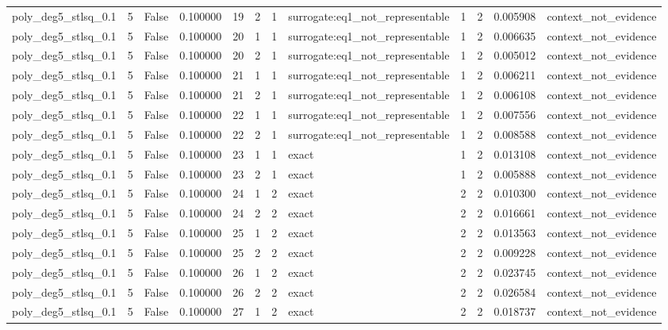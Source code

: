\begin{tabular}{lrrrrrrlrrrl}
poly\_deg5\_stlsq\_0.1 & 5 & False & 0.100000 & 19 & 2 & 1 & surrogate:eq1\_not\_representable & 1 & 2 & 0.005908 & context\_not\_evidence \\
poly\_deg5\_stlsq\_0.1 & 5 & False & 0.100000 & 20 & 1 & 1 & surrogate:eq1\_not\_representable & 1 & 2 & 0.006635 & context\_not\_evidence \\
poly\_deg5\_stlsq\_0.1 & 5 & False & 0.100000 & 20 & 2 & 1 & surrogate:eq1\_not\_representable & 1 & 2 & 0.005012 & context\_not\_evidence \\
poly\_deg5\_stlsq\_0.1 & 5 & False & 0.100000 & 21 & 1 & 1 & surrogate:eq1\_not\_representable & 1 & 2 & 0.006211 & context\_not\_evidence \\
poly\_deg5\_stlsq\_0.1 & 5 & False & 0.100000 & 21 & 2 & 1 & surrogate:eq1\_not\_representable & 1 & 2 & 0.006108 & context\_not\_evidence \\
poly\_deg5\_stlsq\_0.1 & 5 & False & 0.100000 & 22 & 1 & 1 & surrogate:eq1\_not\_representable & 1 & 2 & 0.007556 & context\_not\_evidence \\
poly\_deg5\_stlsq\_0.1 & 5 & False & 0.100000 & 22 & 2 & 1 & surrogate:eq1\_not\_representable & 1 & 2 & 0.008588 & context\_not\_evidence \\
poly\_deg5\_stlsq\_0.1 & 5 & False & 0.100000 & 23 & 1 & 1 & exact & 1 & 2 & 0.013108 & context\_not\_evidence \\
poly\_deg5\_stlsq\_0.1 & 5 & False & 0.100000 & 23 & 2 & 1 & exact & 1 & 2 & 0.005888 & context\_not\_evidence \\
poly\_deg5\_stlsq\_0.1 & 5 & False & 0.100000 & 24 & 1 & 2 & exact & 2 & 2 & 0.010300 & context\_not\_evidence \\
poly\_deg5\_stlsq\_0.1 & 5 & False & 0.100000 & 24 & 2 & 2 & exact & 2 & 2 & 0.016661 & context\_not\_evidence \\
poly\_deg5\_stlsq\_0.1 & 5 & False & 0.100000 & 25 & 1 & 2 & exact & 2 & 2 & 0.013563 & context\_not\_evidence \\
poly\_deg5\_stlsq\_0.1 & 5 & False & 0.100000 & 25 & 2 & 2 & exact & 2 & 2 & 0.009228 & context\_not\_evidence \\
poly\_deg5\_stlsq\_0.1 & 5 & False & 0.100000 & 26 & 1 & 2 & exact & 2 & 2 & 0.023745 & context\_not\_evidence \\
poly\_deg5\_stlsq\_0.1 & 5 & False & 0.100000 & 26 & 2 & 2 & exact & 2 & 2 & 0.026584 & context\_not\_evidence \\
poly\_deg5\_stlsq\_0.1 & 5 & False & 0.100000 & 27 & 1 & 2 & exact & 2 & 2 & 0.018737 & context\_not\_evidence \\

\end{tabular}
